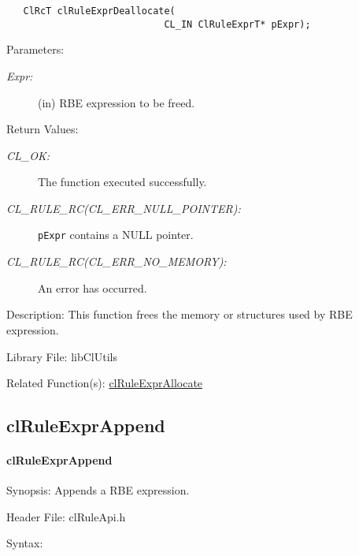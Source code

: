 \begin{flushleft}
\begin{Desc}
\footnotesize\begin{verbatim}   ClRcT clRuleExprDeallocate(
              				CL_IN ClRuleExprT* pExpr);
\end{verbatim}
\normalsize
\end{Desc}
\begin{Desc}
\item[Parameters:]
\begin{description}
\item[{\em Expr:}](in) RBE expression to be freed.\end{description}
\end{Desc}
\begin{Desc}
\item[Return Values:]
\begin{description}
\item[{\em CL\_\-OK:}]The function executed successfully.
\item[{\em CL\_\-RULE\_\-RC(CL\_\-ERR\_\-NULL\_\-POINTER):}]{\tt{pExpr}} contains a NULL pointer.
\item[{\em CL\_\-RULE\_\-RC(CL\_\-ERR\_\-NO\_\-MEMORY):}]An error has occurred.
\end{description}
\end{Desc}
\begin{Desc}
\item[Description:]This function frees the memory or structures used by RBE expression.\end{Desc}
\begin{Desc}
\item[Library File:]lib\-Cl\-Utils\end{Desc}
\begin{Desc}
\item[Related Function(s):]\hyperlink{pagerule101}{cl\-Rule\-Expr\-Allocate} \end{Desc}
\newpage


\subsection{clRuleExprAppend}
\hypertarget{pagerule103}{}\paragraph{cl\-Rule\-Expr\-Append}\label{pagerule103}
\begin{Desc}
\item[Synopsis:]Appends a RBE expression.\end{Desc}
\begin{Desc}
\item[Header File:]clRuleApi.h\end{Desc}
\begin{Desc}
\item[Syntax:]


\end{Desc}
\end{flushleft}
